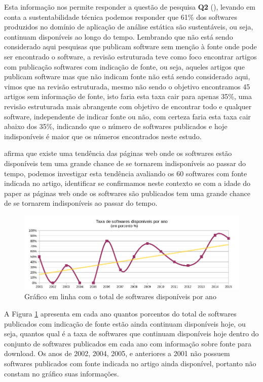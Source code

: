 Esta informação nos permite responder a questão de pesquisa {\bf Q2}
(\QuestaoDois), levando em conta a sustentabilidade técnica podemos responder que 61\% dos
softwares produzidos no domínio de aplicação de análise estática são
sustentáveis, ou seja, continuam disponíveis ao longo do tempo. Lembrando que
não está sendo considerado aqui pesquisas que publicam software sem menção à
fonte onde pode ser encontrado o software, a revisão estruturada teve como foco encontrar
artigos com publicação softwares com indicação de fonte, ou seja, aqueles
artigos que publicam software mas que não indicam fonte não está sendo
considerado aqui, vimos que na revisão estruturada, mesmo não sendo o objetivo
encontramos 45 artigos sem informação de fonte, isto faria esta taxa cair para
apenas 35\%, uma revisão estruturada mais abrangente com objetivo de encontrar
todo e qualquer software, independente de indicar fonte ou não, com certeza
faria esta taxa cair abaixo dos 35\%, indicando que o número de softwares
publicados e hoje indisponíveis é maior que os números encontrados neste estudo.

 afirma que existe uma tendência das páginas
web onde os softwares estão disponíveis tem uma grande chance de se tornarem
indisponíveis ao passar do tempo, podemos investigar esta tendência 
avaliando os 60 softwares com fonte indicada no artigo,
identificar se confirmamos neste contexto se com a idade do paper
as páginas web onde os softwares são publicados tem uma grande chance de se
tornarem indisponíveis ao passar do tempo.

\begin{figure}[h]
  \center
  \includegraphics[scale=0.65]{imagens/softwares-disponivel-por-ano.png}
  \caption{Gráfico em linha com o total de softwares disponíveis por ano}
  \label{softwares-disponivel-por-ano}
\end{figure}

A Figura \ref{softwares-disponivel-por-ano} apresenta em cada ano quantos
porcentos do total de softwares publicados com indicação de fonte estão ainda continuam
disponíveis hoje, ou seja, quantos qual é a taxa de softwares que continuam
disponíveis hoje dentro do conjunto de softwares publicados em cada ano com
informação sobre fonte para download.  Os anos de 2002, 2004, 2005, e
anteriores a 2001 não possuem softwares publicados com fonte indicada no artigo
ainda disponível, portanto não constam no gráfico suas informações.

